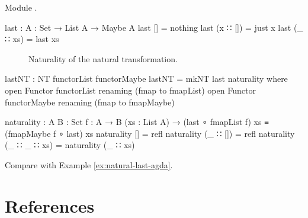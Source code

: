 \begin{example}

  \label{ex:natural-last-agda}

  Module .
  \begin{codeagda}
    last : {A : Set} → List A → Maybe A
    last []       = nothing
    last (x ∷ []) = just x
    last (_ ∷ xs) = last xs
  \end{codeagda}
  \begin{figure}[htbp]
    \begin{center}
    \end{center}
    \caption{Naturality of the  natural transformation.}
    \label{fig:naturality-agda-last}
  \end{figure}
  \begin{codeagda}
    lastNT : NT functorList functorMaybe
    lastNT = mkNT last naturality
      where
        open Functor functorList renaming (fmap to fmapList)
        open Functor functorMaybe renaming (fmap to fmapMaybe)

        naturality : {A B : Set} {f : A → B} (xs : List A) →
                     (last ∘ fmapList f) xs ≡ (fmapMaybe f ∘ last) xs
        naturality []           = refl
        naturality (_ ∷ [])     = refl
        naturality (_ ∷ _ ∷ xs) = naturality (_ ∷ xs)
  \end{codeagda}

  Compare with Example \ref{ex:natural-last-agda}.

\end{example}

\section{References}
\label{sec:naturals-references}


\clearemptydoublepage
